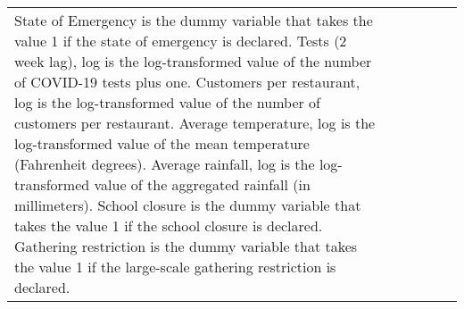 \begin{table}[H]
\begin{tabular}{@{\extracolsep{1pt}}lccccc}
{{State of Emergency is the dummy variable that takes the value 1 if the state of emergency is declared. 
Tests (2 week lag), log is the log-transformed value of the number of COVID-19 tests plus one.
Customers per restaurant, log is the log-transformed value of the number of customers per restaurant.
Average temperature, log is the log-transformed value of the mean temperature (Fahrenheit degrees).
Average rainfall, log is the log-transformed value of the aggregated rainfall (in millimeters).
School closure is the dummy variable that takes the value 1 if the school closure is declared. 
Gathering restriction is the dummy variable that takes the value 1 if the large-scale gathering restriction is declared.}} \\
\end{tabular} 
\end{table} 

